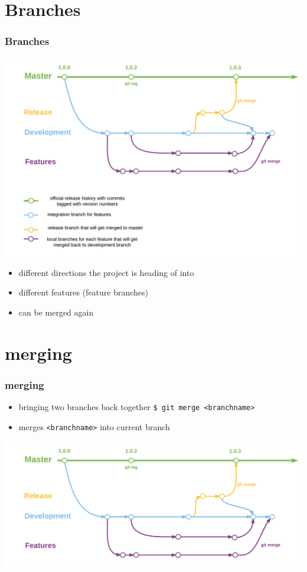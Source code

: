 \documentclass{beamer}
\begin{document}
	\section{Branches}
	\begin{frame}
		\frametitle{Branches}\pause
		\includegraphics[width=.725\linewidth]{images/gitbranches.png}\pause
		\begin{itemize}
			\item different directions the project is heading of into\pause
			\item different features (feature branches)\pause
			\item can be merged again\newline
		\end{itemize}
	\end{frame}
	
	\section{merging}
	\begin{frame}
		\frametitle{merging}\pause
		\begin{itemize}
			\item bringing two branches back together\newline
			\lstinline|$ git merge <branchname>| \pause\newline
			\item merges \lstinline|<branchname>| into current branch\pause
		\end{itemize}
		\includegraphics[width=.725\linewidth]{images/gitbranchesslim.png}
	\end{frame}
	
\end{document}
